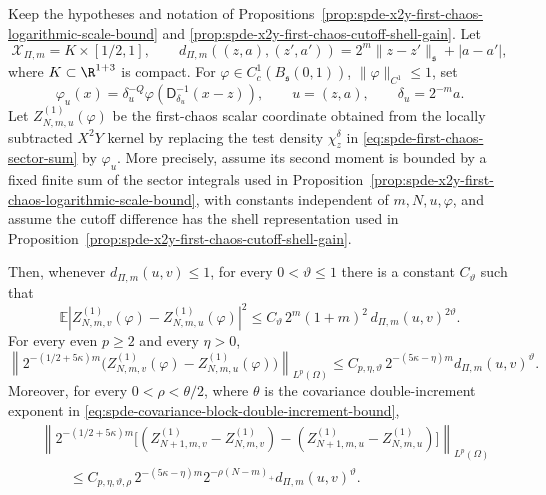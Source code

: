 \begin{proposition}
\label{prop:spde-x2y-first-chaos-parameter-edge-bound}
Keep the hypotheses and notation of
Propositions~\ref{prop:spde-x2y-first-chaos-logarithmic-scale-bound} and
\ref{prop:spde-x2y-first-chaos-cutoff-shell-gain}.  Let
\[
  \mathcal X_{\Pi,m}=K\times[1/2,1],
  \qquad
  d_{\Pi,m}((z,a),(z',a'))=2^m\|z-z'\|_{\mathfrak s}+|a-a'|,
\]
where \(K\subset\R^{1+3}\) is compact.  For
\(\varphi\in C^1_c(B_{\mathfrak s}(0,1))\), \(\|\varphi\|_{C^1}\leq1\), set
\[
  \varphi_u(x)
  =
  \delta_u^{-Q}\varphi(\mathsf D_{\delta_u}^{-1}(x-z)),
  \qquad
  u=(z,a),\qquad
  \delta_u=2^{-m}a .
\]
Let \(Z_{N,m,u}^{(1)}(\varphi)\) be the first-chaos scalar coordinate obtained
from the locally subtracted \(X^2Y\) kernel by replacing the test density
\(\chi_z^\delta\) in
\eqref{eq:spde-first-chaos-sector-sum} by \(\varphi_u\).  More precisely,
assume its second moment is bounded by a fixed finite sum of the sector
integrals used in
Proposition~\ref{prop:spde-x2y-first-chaos-logarithmic-scale-bound}, with
constants independent of \(m,N,u,\varphi\), and assume the cutoff difference
has the shell representation used in
Proposition~\ref{prop:spde-x2y-first-chaos-cutoff-shell-gain}.

Then, whenever \(d_{\Pi,m}(u,v)\leq1\), for every \(0<\vartheta\leq1\) there
is a constant \(C_\vartheta\) such that
\begin{equation}
  \mathbb E
  \left|
    Z_{N,m,v}^{(1)}(\varphi)-Z_{N,m,u}^{(1)}(\varphi)
  \right|^2
  \leq
  C_\vartheta\,2^m(1+m)^2\,d_{\Pi,m}(u,v)^{2\vartheta}.
  \label{eq:spde-first-chaos-parameter-edge-variance}
\end{equation}
For every even \(p\geq2\) and every \(\eta>0\),
\begin{equation}
  \left\|
    2^{-(1/2+5\kappa)m}
    \bigl(
      Z_{N,m,v}^{(1)}(\varphi)-Z_{N,m,u}^{(1)}(\varphi)
    \bigr)
  \right\|_{L^p(\Omega)}
  \leq
  C_{p,\eta,\vartheta}\,
  2^{-(5\kappa-\eta)m}d_{\Pi,m}(u,v)^\vartheta .
  \label{eq:spde-first-chaos-parameter-edge-normalized}
\end{equation}
Moreover, for every \(0<\rho<\theta/2\), where \(\theta\) is the covariance
double-increment exponent in
\eqref{eq:spde-covariance-block-double-increment-bound},
\begin{equation}
\begin{aligned}
  &\left\|
    2^{-(1/2+5\kappa)m}
    \bigl[
      (Z_{N+1,m,v}^{(1)}-Z_{N,m,v}^{(1)})
      -(Z_{N+1,m,u}^{(1)}-Z_{N,m,u}^{(1)})
    \bigr]
  \right\|_{L^p(\Omega)}                                  \\
  &\qquad\leq
  C_{p,\eta,\vartheta,\rho}\,
  2^{-(5\kappa-\eta)m}
  2^{-\rho(N-m)_+}
  d_{\Pi,m}(u,v)^\vartheta .
\end{aligned}
  \label{eq:spde-first-chaos-cutoff-parameter-edge-normalized}
\end{equation}
\end{proposition}

